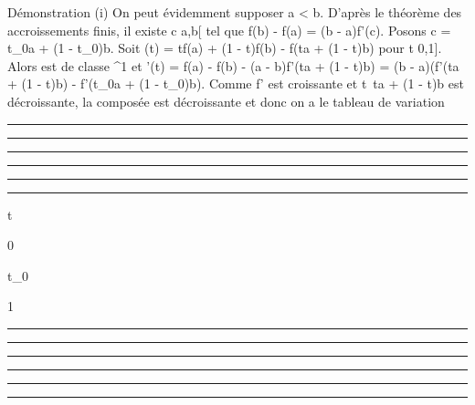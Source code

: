 \documentclass[]{article}
\begin{document}
Démonstration (i) On peut évidemment supposer a \textless{} b. D'après
le théorème des accroissements finis, il existe c \in{]}a,b{[} tel que
f(b) - f(a) = (b - a)f'(c). Posons c = t_0a + (1 -
t_0)b. Soit \phi(t) = tf(a) + (1 - t)f(b) - f(ta + (1 - t)b) pour
t \in {[}0,1{]}. Alors \phi est de classe ^1 et \phi'(t) = f(a) -
f(b) - (a - b)f'(ta + (1 - t)b) = (b - a)(f'(ta + (1 - t)b) -
f'(t_0a + (1 - t_0)b). Comme f' est croissante et
t\mapsto~ta + (1 - t)b est décroissante, la composée
est décroissante et donc on a le tableau de variation

\begin{center}\rule{3in}{0.4pt}\end{center}

\begin{center}\rule{3in}{0.4pt}\end{center}

\begin{center}\rule{3in}{0.4pt}\end{center}

\begin{center}\rule{3in}{0.4pt}\end{center}

\begin{center}\rule{3in}{0.4pt}\end{center}

\begin{center}\rule{3in}{0.4pt}\end{center}

t

0

t_0

1

\begin{center}\rule{3in}{0.4pt}\end{center}

\begin{center}\rule{3in}{0.4pt}\end{center}

\begin{center}\rule{3in}{0.4pt}\end{center}

\begin{center}\rule{3in}{0.4pt}\end{center}

\begin{center}\rule{3in}{0.4pt}\end{center}

\begin{center}\rule{3in}{0.4pt}\end{center}
\end{document}

